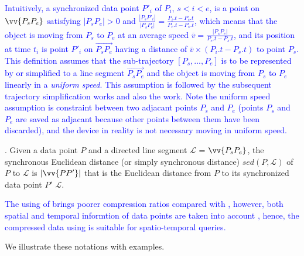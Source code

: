 \textcolor{blue}{Intuitively, a synchronized data point $P'_i$ of $P_i$, $s<i<e$, is a point on $\vv{P_sP_{e}}$ satisfying $|P_sP_e|>0$ and $\frac{|P_sP'_i|}{|P_sP_e|} = \frac{P_i.t - P_s.t}{P_e.t - P_s.t}$, which means that the object is moving from $P_s$ to $P_e$ at an average speed $\overline{v} = \frac{|P_sP_e|}{P_e.t-P_s.t}$, and its position at time $t_i$ is point $P'_i$ on $\overrightarrow{P_sP_{e}}$ having a distance of $\overline{v}\times (P_i.t-P_s.t)$ to point $P_s$.}
\textcolor{blue}{This definition assumes that the sub-trajectory $[P_s, ..., P_e]$ is to be represented by or simplified to a line segment $\overrightarrow{P_sP_e}$ and the object is moving from $P_s$ to $P_e$ linearly in a \textit{uniform speed}. This assumption is followed by the subsequent trajectory simplification works\cite{Meratnia:Spatiotemporal, Chen:Fast, Zhang:Evaluation} and also the work. Note the uniform speed assumption is constraint between two adjacant points $P_s$ and $P_e$ (points $P_s$ and $P_e$ are saved as adjacant because other points between them have been discarded), and the device in reality is not necessary moving in uniform speed.}

. Given a data point $P$ and a directed line segment $\mathcal{L}$ = $\vv{P_{s}P_{e}}$, the synchronous Euclidean distance (or simply synchronous distance) $sed(P, \mathcal{L})$ of $P$ to $\mathcal{L}$ is $|\vv{PP'}|$ that is the Euclidean distance from $P$ to its synchronized data point $P'$ \wrt $\mathcal{L}$. %

\textcolor{blue}{The using of \sed brings poorer compression ratios compared with \ped, however, both spatial and temporal informtion of data points are taken into account \cite{Meratnia:Spatiotemporal}, hence, the compressed data using \sed is suitable for spatio-temporal queries.}


We illustrate these notations with examples.


